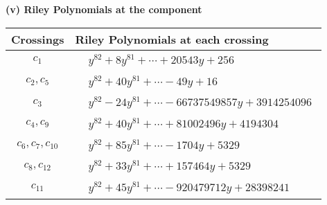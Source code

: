 \documentclass[1p]{elsarticle_modified}
\theoremstyle{definition}
\begin{document}
\flushleft \textbf{(v) Riley Polynomials at the component}\newline \\
\begin{tabular}{m{50pt}|m{274pt}}
Crossings & \hspace{64pt}Riley Polynomials at each crossing \\
\hline $$\begin{aligned}c_{1}\end{aligned}$$&$\begin{aligned}
&y^{82}+8 y^{81}+\cdots+20543 y+256
\end{aligned}$\\
\hline $$\begin{aligned}c_{2},c_{5}\end{aligned}$$&$\begin{aligned}
&y^{82}+40 y^{81}+\cdots-49 y+16
\end{aligned}$\\
\hline $$\begin{aligned}c_{3}\end{aligned}$$&$\begin{aligned}
&y^{82}-24 y^{81}+\cdots-66737549857 y+3914254096
\end{aligned}$\\
\hline $$\begin{aligned}c_{4},c_{9}\end{aligned}$$&$\begin{aligned}
&y^{82}+40 y^{81}+\cdots+81002496 y+4194304
\end{aligned}$\\
\hline $$\begin{aligned}c_{6},c_{7},c_{10}\end{aligned}$$&$\begin{aligned}
&y^{82}+85 y^{81}+\cdots-1704 y+5329
\end{aligned}$\\
\hline $$\begin{aligned}c_{8},c_{12}\end{aligned}$$&$\begin{aligned}
&y^{82}+33 y^{81}+\cdots+157464 y+5329
\end{aligned}$\\
\hline $$\begin{aligned}c_{11}\end{aligned}$$&$\begin{aligned}
&y^{82}+45 y^{81}+\cdots-920479712 y+28398241
\end{aligned}$\\
\hline
\end{tabular}\\~\\
\end{document}
